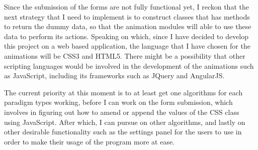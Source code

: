 \documentclass[12pt,a4paper,oneside]{report}
\begin{document}
Since the submission of the forms are not fully functional yet, I reckon that the next strategy that I need to implement is to construct classes that has methods to return the dummy data, so that the animation modules will able to use these data to perform its actions. Speaking on which, since I have decided to develop this project on a web based application, the language that I have chosen for the animations will be CSS3 and HTML5. There might be a possibility that other scripting languages would be involved in the development of the animations such as JavaScript, including its frameworks such as JQuery and AngularJS.

The current priority at this moment is to at least get one algorithms for each paradigm types working, before I can work on the form submission, which involves in figuring out how to amend or append the values of the CSS class using JavaScript. After which, I can pursue on other algorithms, and lastly on other desirable functionality such as the settings panel for the users to use in order to make their usage of the program more at ease.

\end{document}
